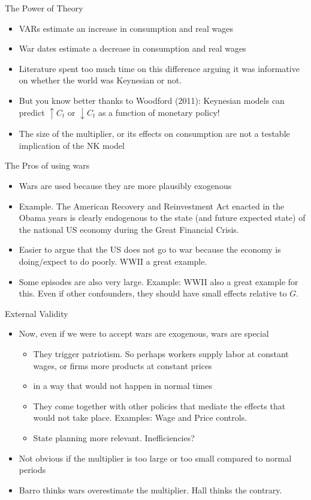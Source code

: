 \documentclass[11pt,aspectratio=169,xcolor={dvipsnames},hyperref={pdftex,pdfpagemode=UseNone,hidelinks,pdfdisplaydoctitle=true},usepdftitle=false]{beamer}
\begin{document}
\begin{frame}{The Power of Theory}
\begin{itemize}
\item VARs estimate an increase in consumption and real wages
\item War dates estimate a decrease in consumption and real wages
\item Literature spent too much time on this difference arguing it was informative on whether the world was Keynesian or not.
\item But you know better thanks to Woodford (2011): Keynesian models can predict $\uparrow C_t$ or $\downarrow C_t$ as a function of monetary policy!
\item The size of the multiplier, or its effects on consumption are not a testable implication of the NK model
\end{itemize}
\end{frame}


\begin{frame}{The Pros of using wars}
\begin{itemize}
\item Wars are used because they are more plausibly exogenous
\item Example. The American Recovery and Reinvestment Act enacted in the Obama years is clearly endogenous to the state (and future expected state) of the national US economy during the Great Financial Crisis.
\item Easier to argue that the US does not go to war because the economy is doing/expect to do poorly. WWII a great example.
\item Some episodes are also very large. Example: WWII also a great example for this. Even if other confounders, they should have small effects relative to $G$.
\end{itemize}
\end{frame}

\begin{frame}{External Validity}
\begin{itemize}
\item Now, even if we were to accept wars are exogenous, wars are special
\begin{itemize}
\item They trigger patriotism. So perhaps workers supply labor at constant wages, or firms more products at constant prices
\item in a way that would not happen in normal times
\item They come together with other policies that mediate the effects that would not take place. Examples: Wage and Price controls.
\item State planning more relevant. Inefficiencies?
\end{itemize}
\item Not obvious if the multiplier is too large or too small compared to normal periods
\item Barro thinks wars overestimate the multiplier. Hall thinks the contrary.
\end{itemize}
\end{frame}
\end{document}
